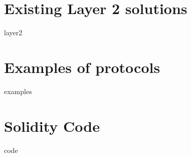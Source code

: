 \section{Existing Layer 2 solutions \cite{Scaling,gudgeonSoKLayerTwoBlockchain2019, jourenkoSoKTaxonomyLayer22019}}
\label{appendix:layer2:solutions}
{layer2}

\section{Examples of protocols}
\label{appendix:layer2:examples}
{examples}

\section{Solidity Code}
\label{appendix:code}
{code}